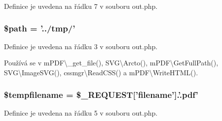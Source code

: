 Definice je uvedena na řádku 7 v souboru out.\-php.

\hypertarget{out_8php_a0a4baf0b22973c07685c3981f0d17fc4}{
\subsubsection[{\$path}]{\setlength{\rightskip}{0pt plus 5cm}\$path = '../tmp/'}}\label{out_8php_a0a4baf0b22973c07685c3981f0d17fc4}


Definice je uvedena na řádku 3 v souboru out.\-php.



Používá se v m\-P\-D\-F\textbackslash{}\-\_\-get\-\_\-file(), S\-V\-G\textbackslash{}\-Arcto(), m\-P\-D\-F\textbackslash{}\-Get\-Full\-Path(), S\-V\-G\textbackslash{}\-Image\-S\-V\-G(), cssmgr\textbackslash{}\-Read\-C\-S\-S() a m\-P\-D\-F\textbackslash{}\-Write\-H\-T\-M\-L().

\hypertarget{out_8php_a14c690f54674f9d2fd0565f051179132}{
\subsubsection[{\$tempfilename}]{\setlength{\rightskip}{0pt plus 5cm}\$tempfilename = \$\-\_\-\-R\-E\-Q\-U\-E\-S\-T\mbox{[}'filename'\mbox{]}.'.pdf'}}\label{out_8php_a14c690f54674f9d2fd0565f051179132}


Definice je uvedena na řádku 5 v souboru out.\-php.

